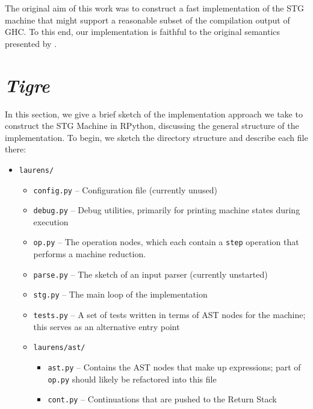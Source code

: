 \documentclass[preprint]{sigplanconf}
\begin{document}
The original aim of this work was to construct a fast implementation of the
STG machine that might support a reasonable subset of the compilation output
of GHC. To this end, our implementation is faithful to the original semantics
presented by \citet{spj:stgmachine}.

\section{\emph{Tigre}} %

In this section, we give a brief sketch of the implementation approach we take
to construct the STG Machine in RPython, discussing the general structure of the
implementation. To begin, we sketch the directory structure and describe each file
there:

\begin{itemize}
\item \lstinline{laurens/}
  \begin{itemize}
    \item \lstinline{config.py} -- Configuration file (currently unused)
    \item \lstinline{debug.py}  -- Debug utilities, primarily for printing
                                   machine states during execution
    \item \lstinline{op.py}     -- The operation nodes, which each contain
                                   a \lstinline{step} operation that performs
                                   a machine reduction.
    \item \lstinline{parse.py}  -- The sketch of an input parser (currently 
                                   unstarted)
    \item \lstinline{stg.py}    -- The main loop of the implementation
    \item \lstinline{tests.py}  -- A set of tests written in terms of AST
                                   nodes for the machine; this serves as
                                   an alternative entry point
  \item \lstinline{laurens/ast/}
    \begin{itemize}
      \item \lstinline{ast.py}  -- Contains the AST nodes that make up expressions;
                                   part of \lstinline{op.py} should likely be
                                   refactored into this file
      \item \lstinline{cont.py} -- Continuations that are pushed to the Return Stack 

\end{itemize}
\end{itemize}
\end{itemize}
\end{document}
